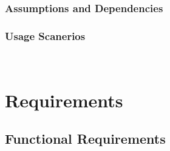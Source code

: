 \documentclass[12pt]{article}
\begin{document}
\subsubsection{Assumptions and Dependencies} \label{sec_assumpt}

\subsubsection{Usage Scanerios}


~\newpage

\section{Requirements} \label{sec_Requirements}


\subsection{Functional Requirements} \label{sec_FunctionalRequirements}
\end{document}
